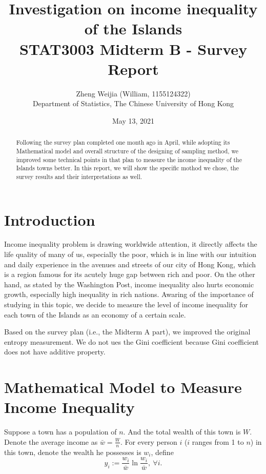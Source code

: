 \documentclass[12pt]{article}%
\begin{document}
\title{
Investigation on income inequality of the Islands\\
\Large STAT3003 Midterm B - Survey Report}
\author{Zheng Weijia (William, 1155124322) \\
Department of Statistics,
The Chinese University of Hong Kong}
\date{May 13, 2021}
\maketitle

\begin{abstract}
    Following the survey plan completed one month ago in April, 
    while adopting its Mathematical model and 
    overall structure of the designing of sampling method, 
    we improved some technical points in that plan 
    to measure the income inequality of the Islands towns better. 
    In this report, we will show the specific mothod we chose, 
    the survey results and their interpretations as well.

\end{abstract}

\section{Introduction}
Income inequality problem is drawing worldwide attention, 
it directly affects the life quality of many of us, especially the poor, 
which is in line with our intuition and daily experience 
in the avenues and streets of our city of Hong Kong, 
which is a region famous for its acutely huge gap between rich and poor.
On the other hand, as stated by the Washington Post, income inequality also
hurts economic growth, especially high inequality in rich nations. 
Awaring of the importance of studying in this topic,
we decide to measure the level of income inequality 
for each town of the Islands as an economy of a certain scale. 

Based on the survey plan (i.e., the Midterm A part), 
we improved the original entropy measurement. 
We do not ues the Gini coefficient because 
Gini coefficient does not have additive property.


\section{Mathematical Model to Measure Income Inequality}
Suppose a town has a population of $n$. 
And the total wealth of this town is $W$. 
Denote the average income as $\bar{w}=\frac{W}{n}$.
For every person $i$ ($i$ ranges from 1 to $n$) in this town, 
denote the wealth he possesses is $w_i$, define 
$$y_i := \frac{w_i}{\bar{w}}\ln{ \frac{w_i}{\bar{w}} } ,~ \forall i.$$
\end{document}
